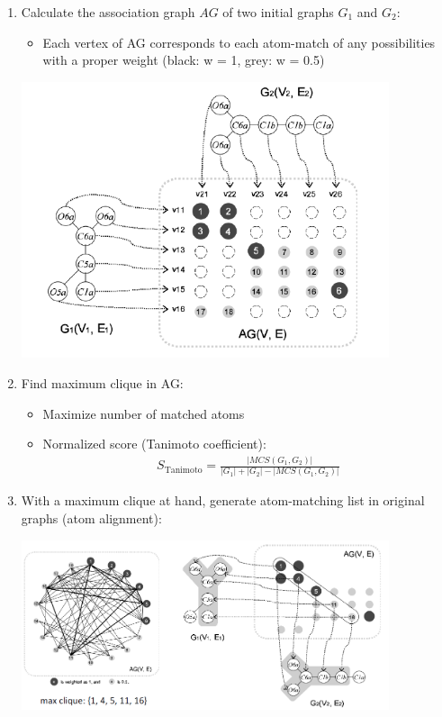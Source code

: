 \begin{enumerate}
    \item Calculate the association graph $AG$ of two initial graphs $G_1$ and $G_2$:
    \begin{itemize}
        \item Each vertex of AG corresponds to each atom-match of any possibilities with a proper weight (black: w = 1, grey: w = 0.5)
    \end{itemize}
    \begin{center}\includegraphics[width=0.85\textwidth]{img/cheminformatics/McsSimcompAlgorithm1.png}\end{center}
    \item Find maximum clique in AG:
    \begin{itemize}
        \item Maximize number of matched atoms
        \item Normalized score (Tanimoto coefficient):
        \begin{align}
            S_\mathrm{Tanimoto}=\frac{|MCS(G_1, G_2)|}{|G_1|+|G_2|-|MCS(G_1,G_2)|}
        \end{align}
    \end{itemize}
    \item With a maximum clique at hand, generate atom-matching list in original graphs (atom alignment):
    \begin{center}\includegraphics[width=0.85\textwidth]{img/cheminformatics/McsSimcompAlgorithm3.png}\end{center}
\end{enumerate}

